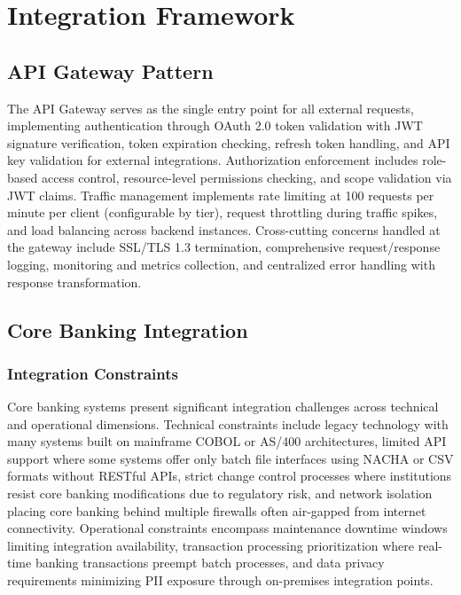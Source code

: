 \section{Integration Framework}\label{sec:integration_framework}

\subsection{API Gateway Pattern}

The API Gateway serves as the single entry point for all external requests, implementing authentication through OAuth 2.0 token validation with JWT signature verification, token expiration checking, refresh token handling, and API key validation for external integrations. Authorization enforcement includes role-based access control, resource-level permissions checking, and scope validation via JWT claims. Traffic management implements rate limiting at 100 requests per minute per client (configurable by tier), request throttling during traffic spikes, and load balancing across backend instances. Cross-cutting concerns handled at the gateway include SSL/TLS 1.3 termination, comprehensive request/response logging, monitoring and metrics collection, and centralized error handling with response transformation.

\subsection{Core Banking Integration}

\subsubsection{Integration Constraints}

Core banking systems present significant integration challenges across technical and operational dimensions. Technical constraints include legacy technology with many systems built on mainframe COBOL or AS/400 architectures, limited API support where some systems offer only batch file interfaces using NACHA or CSV formats without RESTful APIs, strict change control processes where institutions resist core banking modifications due to regulatory risk, and network isolation placing core banking behind multiple firewalls often air-gapped from internet connectivity. Operational constraints encompass maintenance downtime windows limiting integration availability, transaction processing prioritization where real-time banking transactions preempt batch processes, and data privacy requirements minimizing PII exposure through on-premises integration points.

